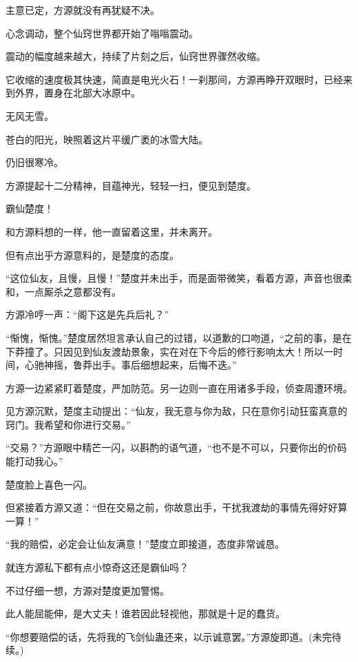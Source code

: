 \begin{this_body}
主意已定，方源就没有再犹疑不决。

心念调动，整个仙窍世界都开始了嗡嗡震动。

震动的幅度越来越大，持续了片刻之后，仙窍世界骤然收缩。

它收缩的速度极其快速，简直是电光火石！一刹那间，方源再睁开双眼时，已经来到外界，置身在北部大冰原中。

无风无雪。

苍白的阳光，映照着这片平缓广袤的冰雪大陆。

仍旧很寒冷。

方源提起十二分精神，目蕴神光，轻轻一扫，便见到楚度。

霸仙楚度！

和方源料想的一样，他一直留着这里，并未离开。

但有点出乎方源意料的，是楚度的态度。

“这位仙友，且慢，且慢！”楚度并未出手，而是面带微笑，看着方源，声音也很柔和，一点厮杀之意都没有。

方源冷哼一声：“阁下这是先兵后礼？”

“惭愧，惭愧。”楚度居然坦言承认自己的过错，以道歉的口吻道，“之前的事，是在下莽撞了。只因见到仙友渡劫景象，实在对在下今后的修行影响太大！所以一时间，心驰神摇，鲁莽出手。事后细想起来，后悔不迭。”

方源一边紧紧盯着楚度，严加防范。另一边则一直在用诸多手段，侦查周遭环境。

见方源沉默，楚度主动提出：“仙友，我无意与你为敌，只在意你引动狂蛮真意的窍门。我希望和你进行交易。”

“交易？”方源眼中精芒一闪，以斟酌的语气道，“也不是不可以，只要你出的价码能打动我心。”

楚度脸上喜色一闪。

但紧接着方源又道：“但在交易之前，你故意出手，干扰我渡劫的事情先得好好算一算！”

“我的赔偿，必定会让仙友满意！”楚度立即接道，态度非常诚恳。

就连方源私下都有点小惊奇这还是霸仙吗？

不过仔细一想，方源对楚度更加警惕。

此人能屈能伸，是大丈夫！谁若因此轻视他，那就是十足的蠢货。

“你想要赔偿的话，先将我的飞剑仙蛊还来，以示诚意罢。”方源旋即道。(未完待续。)

\end{this_body}

